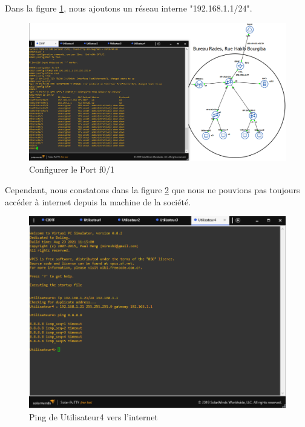 Dans la figure \ref{Chap2.2.4}, nous ajoutons un réseau interne "192.168.1.1/24".  \\

\begin{figure}[H]
 \centering
    \includegraphics[width=16cm]{Images/BRades-Topologie4.png}
    \caption{Configurer le Port f0/1}
    \label{Chap2.2.4}
\end{figure}

Cependant, nous constatons dans la figure \ref{Chap2.2.5} que nous ne pouvions pas toujours accéder à internet depuis la machine de la société. \\

\begin{figure}[H]
 \centering
    \includegraphics[width=16cm]{Images/BRades-Topologie5.png}
    \caption{Ping de Utilisateur4 vers l'internet}
    \label{Chap2.2.5}
\end{figure}

